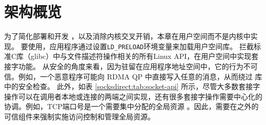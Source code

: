 \section{架构概览}
\label{socksdirect:sec:architecture}





为了简化部署和开发 \cite {andromeda}，以及消除内核交叉开销，本章在用户空间而不是内核中实现\sys{}。
要使用\sys{}，应用程序通过设置\texttt {LD\_PRELOAD}环境变量来加载用户空间库\libipc {}。 \libipc {} 拦截标准C库（glibc）中与文件描述符操作相关的所有Linux API，在用户空间中实现套接字功能。
从安全的角度来看，因为\libipc {}驻留在应用程序地址空间中，它的行为不可信。例如，一个恶意程序可能向 RDMA QP 中直接写入任意的消息，从而绕过 \libipc{} 库中的安全检查。
此外，如表 \ref{socksdirect:tab:socket-api} 所示，尽管大多数套接字操作可以在调用者本地或连接的两端之间实现，还有很多套接字操作需要中心化的协调。例如，TCP端口号是一个需要集中分配的全局资源 \cite {lin2016scalable,nsdi19freeflow}。因此，需要在\libipc {}之外的可信组件来强制实施访问控制和管理全局资源。

